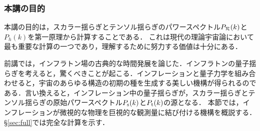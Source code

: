 
\vspace{0.5cm}
\subsubsection*{本講の目的}
本講の目的は，スカラー揺らぎとテンソル揺らぎのパワースペクトル$P_{\cal R}(k)$と$P_h(k)$を第一原理から計算することである．
これは現代の理論宇宙論において最も重要な計算の一つであり，理解するために努力する価値は十分にある．








 
\label{sec:qf}



前講では，インフラトン場の古典的な時間発展を論じた．インフラトンの量子揺らぎを考えると，驚くべきことが起こる．インフレーションと量子力学を組み合わせると，宇宙のあらゆる構造の初期の種を生成する美しい機構が得られるのである．言い換えると，インフレーション中の量子揺らぎが，スカラー揺らぎとテンソル揺らぎの原始パワースペクトル$P_{\rm s}(k)$と$P_{\rm t}(k)$の源となる．
本節では，インフレーションが微視的な物理を巨視的な観測量に結び付ける機構を概説する．
\S\ref{sec:full}では完全な計算を示す．


